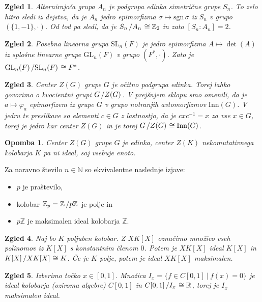 \documentclass[10pt, a4paper]{article}
\newtheorem*{opomba}{Opomba}
\newtheorem{zgled}{Zgled}[section]
\newcommand{\N}{\mathbb {N}}
\newcommand{\Z}{\mathbb {Z}}
\newcommand{\R}{\mathbb {R}}
\newcommand{\quot}[2]{{\raisebox{0em}{$#1$}\left/\raisebox{0em}{$#2$}\right.}}
\newcommand{\sgn}{\mathrm{sgn}\,}
\begin{document}
\begin{zgled}
  Alternirajoča grupa $A_n$ je podgrupa edinka simetrične grupe $S_n$.
  To zelo hitro sledi iz dejstva, da je $A_n$ jedro epimorfizma $\sigma \mapsto \sgn \sigma$
  iz $S_n$ v grupo $(\{1, -1\}, \cdot)$. Od tod pa sledi, da je $\quot{S_n}{A_n} \cong \Z_2$
  in zato $[S_n : A_n] = 2$.
\end{zgled}

\begin{zgled}
  Posebna linearna grupa $\mathrm{SL}_n (F)$ je jedro epimorfizma $A \mapsto \det (A)$
  iz splošne linearne grupe $\mathrm{GL}_n (F)$ v grupo $(F^*, \cdot)$.
  Zato je $\quot{\mathrm{GL}_n (F)}{\mathrm{SL}_n (F)} \cong F^*$.
\end{zgled}

\begin{zgled}
  Center $Z(G)$ grupe $G$ je očitno podgrupa edinka.
  Torej lahko govorimo o kvocientni grupi $\quot{G}{Z(G)}$.
  V prejšnjem sklopu smo omenili, da je $a \mapsto \varphi_a$ epimorfizem iz grupe $G$ 
  v grupo notranjih avtomorfizmov $\mathrm{Inn} (G)$.
  V jedru te preslikave so elementi $c \in G$ z lastnostjo,
  da je $cxc^{-1} = x$ za vse $x \in G$, torej je jedro kar center $Z(G)$
  in je torej $\quot{G}{Z(G)} \cong \mathrm{Inn}(G)$.
\end{zgled}

\begin{opomba}
  Center $Z(G)$ grupe $G$ je edinka, center $Z(K)$ nekomutativnega kolobarja $K$ pa 
  ni ideal, saj vsebuje enoto.
\end{opomba}

Za naravno število $n \in \N$ so ekvivalentne naslednje izjave:
\begin{itemize}
  \item $p$ je praštevilo,
  \item kolobar $\Z_p = \quot{\Z}{p\Z}$ je polje in 
  \item $p\Z$ je maksimalen ideal kolobarja $\Z$.
\end{itemize}

\begin{zgled}
  Naj bo $K$ poljuben kolobar.
  Z $XK [X]$ označimo množico vseh polinomov iz $K[X]$ s konstantnim členom $0$.
  Potem je $XK [X]$ ideal $K[X]$ in $\quot{K[X]}{XK[X]} \cong K$.
  Če je $K$ polje, potem je ideal $XK[X]$ maksimalen.
\end{zgled}

\begin{zgled}
  Izberimo točko $x \in [0, 1]$.
  Množica $I_x = \{f \in C[0, 1]\ |\ f(x) = 0\}$ je ideal 
  kolobarja (oziroma algebre) $C[0, 1]$ in $\quot{C[0, 1]}{I_x} \cong \R$,
  torej je $I_x$ maksimalen ideal.
\end{zgled}
\end{document}

